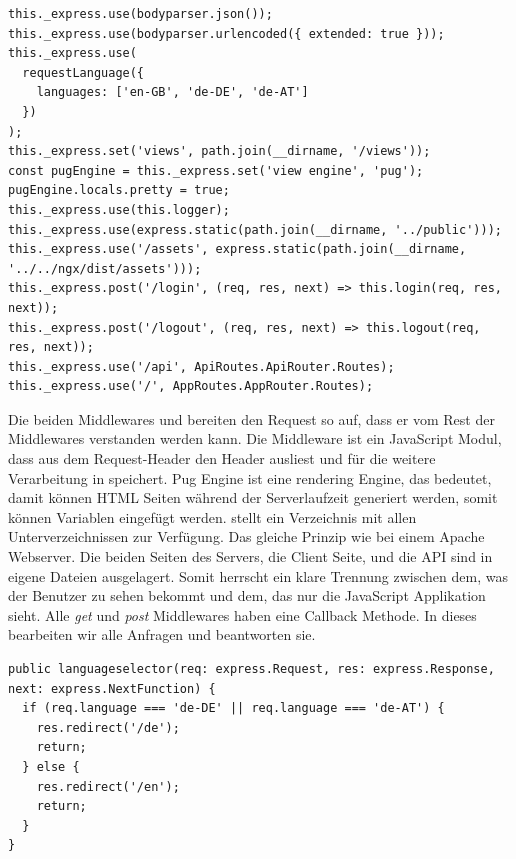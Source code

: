 \begin{lstlisting}[style=TS,caption=Middlewares,label=middlewares]
this._express.use(bodyparser.json());
this._express.use(bodyparser.urlencoded({ extended: true }));
this._express.use(
  requestLanguage({
    languages: ['en-GB', 'de-DE', 'de-AT']
  })
);
this._express.set('views', path.join(__dirname, '/views'));
const pugEngine = this._express.set('view engine', 'pug');
pugEngine.locals.pretty = true;
this._express.use(this.logger);
this._express.use(express.static(path.join(__dirname, '../public')));
this._express.use('/assets', express.static(path.join(__dirname, '../../ngx/dist/assets')));
this._express.post('/login', (req, res, next) => this.login(req, res, next));
this._express.post('/logout', (req, res, next) => this.logout(req, res, next));
this._express.use('/api', ApiRoutes.ApiRouter.Routes);
this._express.use('/', AppRoutes.AppRouter.Routes);
\end{lstlisting}

Die beiden Middlewares  und  bereiten den Request so auf, dass er vom Rest der Middlewares verstanden werden kann. Die Middleware  ist ein JavaScript Modul, dass aus dem Request-Header den Header  ausliest und für die weitere Verarbeitung in  speichert. Pug Engine ist eine rendering Engine, das bedeutet, damit können \ac{HTML} Seiten während der Serverlaufzeit generiert werden, somit können Variablen eingefügt werden.  stellt ein Verzeichnis mit allen Unterverzeichnissen zur Verfügung. Das gleiche Prinzip wie bei einem Apache Webserver. Die beiden Seiten des Servers, die Client Seite, und die \ac{API} sind in eigene Dateien ausgelagert. Somit herrscht ein klare Trennung zwischen dem, was der Benutzer zu sehen bekommt und dem, das nur die JavaScript Applikation sieht. Alle \textit{get} und \textit{post} Middlewares haben eine Callback Methode. In dieses bearbeiten wir alle Anfragen und beantworten sie.

\begin{lstlisting}[caption=Sprachenauswahl,style=TS,label=sprachenauswahl]
public languageselector(req: express.Request, res: express.Response, next: express.NextFunction) {
  if (req.language === 'de-DE' || req.language === 'de-AT') {
    res.redirect('/de');
    return;
  } else {
    res.redirect('/en');
    return;
  }
}
\end{lstlisting}

